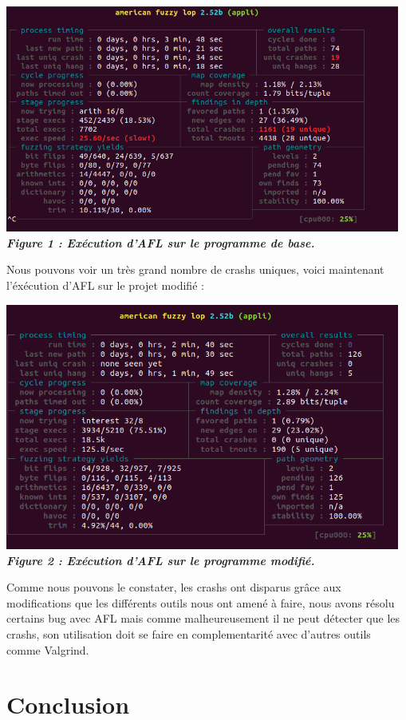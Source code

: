 \documentclass{report}
\begin{document}
\begin{center}
  \includegraphics[width=13cm]{captureafl1.png}
\textbf{\textit{Figure 1 : Exécution d'AFL sur le programme de base.}}
\end{center}

Nous pouvons voir un très grand nombre de crashs uniques, voici maintenant l'éxécution d'AFL sur le projet modifié : 

\begin{center}
  \includegraphics[width=13cm]{captureafl2.png}
\textbf{\textit{Figure 2 : Exécution d'AFL sur le programme modifié.}}
\end{center}

Comme nous pouvons le constater, les crashs ont disparus grâce aux modifications que les différents outils nous ont amené à faire, nous avons résolu certains bug avec AFL mais comme malheureusement il ne peut détecter que les crashs, son utilisation doit se faire en complementarité avec d'autres outils comme Valgrind.

\chapter{Conclusion}
\end{document}
